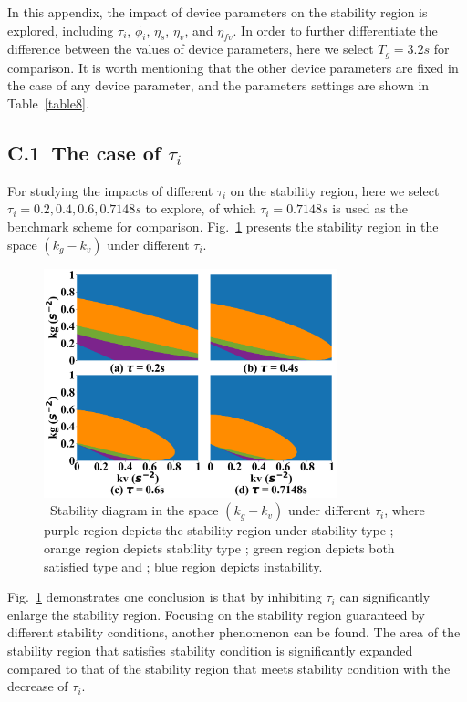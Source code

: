 \documentclass[journal]{IEEEtran}
\begin{document}
\label{AppendixB}

In this appendix, the impact of device parameters on the stability region is explored, including $\tau_i$, $\phi_i$, $\eta_s$, $\eta_v$, and $\eta_{fv}$. In order to further differentiate the difference between the values of device parameters, here we select $T_g = 3.2s$ for comparison. It is worth mentioning that the other device parameters are fixed in the case of any device parameter, and the parameters settings are shown in Table~\ref{table8}.

\subsection*{C.1~The case of $\tau_i$}

For studying the impacts of different $\tau_i$ on the stability region, here we select $\tau_i=0.2,0.4,0.6,0.7148 s$ to explore, of which $\tau_i=0.7148s$ is used as the benchmark scheme for comparison. Fig.~\ref{fig8} presents the stability region in the space $(k_g-k_v)$ under different $\tau_i$.

\begin{figure}
  \centering
  \includegraphics[width=8.5cm]{figs/fig8.png}
  \caption{~Stability diagram in the space $(k_g-k_v)$ under different $\tau_i$, where purple region depicts the stability region under stability type \uppercase\expandafter{}; orange region depicts stability type \uppercase\expandafter{}; green region depicts both satisfied type \uppercase\expandafter{} and \uppercase\expandafter{}; blue region depicts instability.}
  \label{fig8}
\end{figure}

Fig.~\ref{fig8} demonstrates one conclusion is that by inhibiting $\tau_i$ can significantly enlarge the stability region. Focusing on the stability region guaranteed by different stability conditions, another phenomenon can be found. The area of the stability region that satisfies stability condition \uppercase\expandafter{} is significantly expanded compared to that of the stability region that meets stability condition \uppercase\expandafter{} with the decrease of $\tau_i$.
\end{document}
